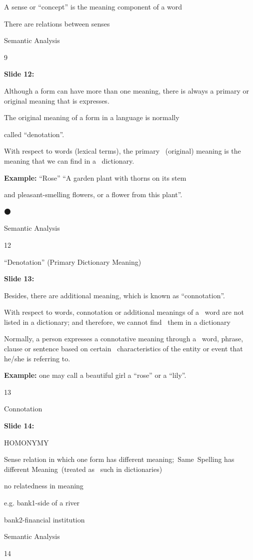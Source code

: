 \documentclass[11pt,a4paper]{article}
\begin{document}
A sense or “concept” is the meaning component of a word

There are relations between senses

Semantic Analysis

9

\textbf{Slide 12:}

Although a form can have more than one meaning,  there is always a primary or original meaning that  is expresses.

The original meaning of a form in a language is normally

called “denotation”.

With respect to words (lexical terms), the primary  (original) meaning is the meaning that we can find in a  dictionary.

\textbf{Example:}  “Rose” “A garden plant with thorns on its stem

and pleasant-smelling flowers, or a flower from this plant”.

⚫

Semantic Analysis

12

“Denotation” (Primary Dictionary Meaning)

\textbf{Slide 13:}

Besides, there are additional meaning, which is known as “connotation”.

With respect to words, connotation or additional meanings of a  word are not listed in a dictionary; and therefore, we cannot find  them in a dictionary

Normally, a person expresses a connotative meaning through a  word, phrase, clause or sentence based on certain  characteristics of the entity or event that he/she is referring to.

\textbf{Example:}  one may call a beautiful girl a “rose” or a “lily”.

13

Connotation

\textbf{Slide 14:}

HOMONYMY

Sense relation in which one form has different meaning; Same Spelling has different Meaning (treated as  such in dictionaries)

no relatedness in meaning

e.g. bank1-side of a river

bank2-financial institution

Semantic Analysis

14
\end{document}
